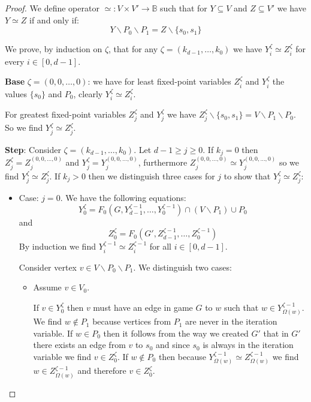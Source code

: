 \begin{theorem}
\begin{proof}
		
		We define operator $\simeq : V \times V' \rightarrow \mathbb{B}$ such that for $Y \subseteq V$ and $Z \subseteq V'$ we have $Y \simeq Z$ if and only if:
		\[ Y \backslash P_0 \backslash P_1 = Z \backslash \{s_0,s_1\}\]
		
		We prove, by induction on $\zeta$, that for any $\zeta = (k_{d-1},\dots,k_0)$ we have $Y_i^{\zeta} \simeq Z_i^{\zeta}$ for every $i \in [0,d-1]$.
	
		
		\textbf{Base} $\zeta = (0,0,\dots,0)$: we have for least fixed-point variables $Z_i^\zeta$ and $Y_i^{\zeta}$ the values $\{s_0\}$ and $P_0$, clearly $Y_i^\zeta \simeq Z_i^{\zeta}$. 
		
		For greatest fixed-point variables $Z_j^\zeta$ and $Y_j^{\zeta}$ we have $Z_j^\zeta \backslash \{s_0,s_1\} = V \backslash P_1 \backslash P_0$. So we find $Y_j^\zeta \simeq Z_j^{\zeta}$.
		
		\textbf{Step}: Consider $\zeta = (k_{d-1},\dots,k_0)$. Let $d-1 \geq j \geq 0$. If $k_j = 0$ then $Z_j^\zeta = Z_j^{(0,0,\dots,0)}$ and $Y_j^{\zeta} = Y_j^{(0,0,\dots,0)}$, furthermore $Z_j^{(0,0,\dots,0)}\simeq Y_j^{(0,0,\dots,0)}$ so we find $Y_j^{\zeta} \simeq Z_j^{\zeta}$.
		If $k_j > 0$ then we distinguish three cases for $j$ to show that $Y_j^{\zeta} \simeq Z_j^{\zeta}$:
		\begin{itemize}
			\item Case: $j=0$. We have the following equations:
			\[ Y_0^{\zeta} = F_0(G,Y_{d-1}^{\zeta-1},\dots,Y_0^{\zeta-1}) \cap (V\backslash P_1) \cup P_0 \]
			and
			\[ Z_0^{\zeta} = F_0(G',Z_{d-1}^{\zeta-1},\dots,Z_0^{\zeta-1}) \]
			By induction we find $Y_i^{\zeta-1} \simeq Z_i^{\zeta-1}$ for all $i \in [0,d-1]$.
			
			
			Consider vertex $v \in V\backslash P_0 \backslash P_1$. We distinguish two cases:
			\begin{itemize}
				\item Assume $v \in V_0$.
				
				If $v \in Y_0^{\zeta}$ then $v$ must have an edge in game $G$ to $w$ such that $w\in Y^{\zeta-1}_{\Omega(w)}$. We find $w \notin P_1$ because vertices from $P_1$ are never in the iteration variable. If $w \in P_0$ then it follows from the way we created $G'$ that in $G'$ there exists an edge from $v$ to $s_0$ and since $s_0$ is always in the iteration variable we find $v \in Z_0^{\zeta}$. If $w \notin P_0$ then because $Y^{\zeta-1}_{\Omega(w)} \simeq Z^{\zeta-1}_{\Omega(w)}$ we find $w \in Z^{\zeta-1}_{\Omega(w)}$ and therefore $v \in Z_0^{\zeta}$.
				

\end{itemize}
\end{itemize}
\end{proof}
\end{theorem}
